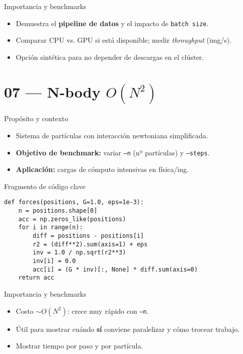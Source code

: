 \documentclass[aspectratio=169,professionalfonts]{beamer}
\begin{document}
\begin{frame}{Importancia y benchmarks}
\begin{itemize}
  \item Demuestra el \textbf{pipeline de datos} y el impacto de \texttt{batch size}.
  \item Comparar CPU vs. GPU si está disponible; medir \emph{throughput} (img/s).
  \item Opción sintética para no depender de descargas en el clúster.
\end{itemize}
\end{frame}

\section{07 — N-body \(O(N^2)\)}

\begin{frame}{Propósito y contexto}
\begin{itemize}
  \item Sistema de partículas con interacción newtoniana simplificada.
  \item \textbf{Objetivo de benchmark:} variar \texttt{--n} (nº partículas) y \texttt{--steps}.
  \item \textbf{Aplicación:} cargas de cómputo intensivas en física/ing.
\end{itemize}
\end{frame}

\begin{frame}[fragile]{Fragmento de código clave}
\begin{verbatim}
def forces(positions, G=1.0, eps=1e-3):
    n = positions.shape[0]
    acc = np.zeros_like(positions)
    for i in range(n):
        diff = positions - positions[i]
        r2 = (diff**2).sum(axis=1) + eps
        inv = 1.0 / np.sqrt(r2**3)
        inv[i] = 0.0
        acc[i] = (G * inv)[:, None] * diff.sum(axis=0)
    return acc
\end{verbatim}
\end{frame}

\begin{frame}{Importancia y benchmarks}
\begin{itemize}
  \item Costo \(\sim O(N^2)\): crece muy rápido con \texttt{--n}.
  \item Útil para mostrar cuándo \textbf{sí} conviene paralelizar y cómo trocear trabajo.
  \item Mostrar tiempo por paso y por partícula.
\end{itemize}
\end{frame}
\end{document}
